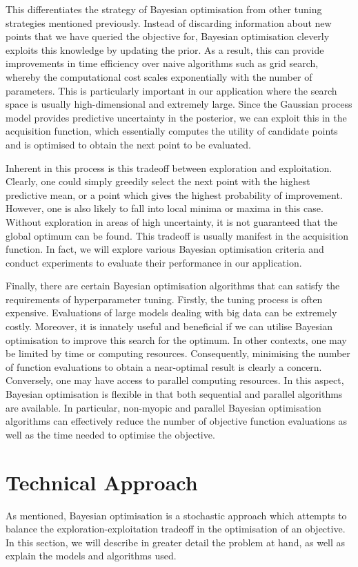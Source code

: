 \documentclass[letterpaper]{article}
\begin{document}
This differentiates the strategy of Bayesian optimisation from other tuning
strategies mentioned previously. Instead of discarding information about new points
that we have queried the objective for, Bayesian optimisation cleverly exploits this
knowledge by updating the prior. As a result, this can provide improvements in time
efficiency over naive algorithms such as grid search, whereby the computational
cost scales exponentially with the number of parameters. This is particularly
important in our application where the search space is usually high-dimensional
and extremely large. Since the Gaussian process model provides predictive uncertainty
in the posterior, we can exploit this in the acquisition function, which essentially
computes the utility of candidate points and is optimised to obtain the next point
to be evaluated.

Inherent in this process is this tradeoff between exploration and exploitation.
Clearly, one could simply greedily select the next point with the highest predictive
mean, or a point which gives the highest probability of improvement. However, one
is also likely to fall into local minima or maxima in this case. Without exploration
in areas of high uncertainty, it is not guaranteed that the global optimum can be
found. This tradeoff is usually manifest in the acquisition function. In fact,
we will explore various Bayesian optimisation criteria and conduct experiments to
evaluate their performance in our application.

Finally, there are certain Bayesian optimisation algorithms that can satisfy the
requirements of hyperparameter tuning. Firstly, the tuning process is often
expensive. Evaluations of large models dealing with big data can be extremely
costly. Moreover, it is innately useful and beneficial if we can utilise
Bayesian optimisation to improve this search for the optimum. In other contexts,
one may be limited by time or computing resources. Consequently, minimising the
number of function evaluations to obtain a near-optimal result is clearly a concern.
Conversely, one may have access to parallel computing resources. In this aspect,
Bayesian optimisation is flexible in that both sequential and parallel algorithms
are available. In particular, non-myopic and parallel Bayesian optimisation
algorithms can effectively reduce the number of objective function evaluations
as well as the time needed to optimise the objective.

\section{Technical Approach}
As mentioned, Bayesian optimisation is a stochastic approach which attempts to
balance the exploration-exploitation tradeoff in the optimisation of an objective.
In this section, we will describe in greater detail the problem at hand, as well
as explain the models and algorithms used.
\end{document}

